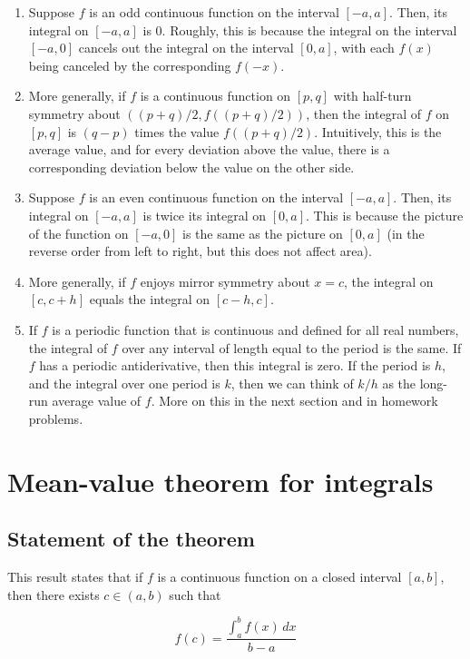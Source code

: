 \documentclass{amsart}
\begin{document}
\begin{enumerate}
\item Suppose $f$ is an odd continuous function on the interval
  $[-a,a]$. Then, its integral on $[-a,a]$ is $0$. Roughly, this is
  because the integral on the interval $[-a,0]$ cancels out the
  integral on the interval $[0,a]$, with each $f(x)$ being canceled by
  the corresponding $f(-x)$.
\item More generally, if $f$ is a continuous function on $[p,q]$ with
  half-turn symmetry about $((p + q)/2,f((p+q)/2))$, then the integral
  of $f$ on $[p,q]$ is $(q - p)$ times the value $f((p +
  q)/2)$. Intuitively, this is the average value, and for every
  deviation above the value, there is a corresponding deviation below
  the value on the other side.
\item Suppose $f$ is an even continuous function on the interval
  $[-a,a]$. Then, its integral on $[-a,a]$ is twice its integral on
  $[0,a]$. This is because the picture of the function on $[-a,0]$ is
  the same as the picture on $[0,a]$ (in the reverse order from left
  to right, but this does not affect area).
\item More generally, if $f$ enjoys mirror symmetry about $x = c$,
  the integral on $[c,c+h]$ equals the integral on $[c-h,c]$.
\item If $f$ is a periodic function that is continuous and defined for
  all real numbers, the integral of $f$ over any interval of length
  equal to the period is the same. If $f$ has a periodic
  antiderivative, then this integral is zero. If the period is $h$,
  and the integral over one period is $k$, then we can think of $k/h$
  as the long-run average value of $f$. More on this in the next
  section and in homework problems.
\end{enumerate}

\section{Mean-value theorem for integrals}

\subsection{Statement of the theorem}

This result states that if $f$ is a continuous function on a closed
interval $[a,b]$, then there exists $c \in (a,b)$ such that

$$f(c) = \frac{\int_a^b f(x) \, dx}{b - a}$$
\end{document}
